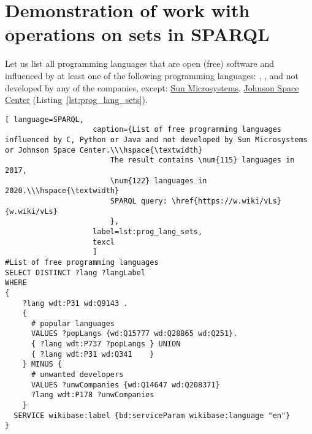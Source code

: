 \label{question:prog_lang_1}

\section{Demonstration of work with operations on sets in SPARQL}

Let us list all programming languages that are open (free) software and influenced by at least one of the following programming languages: , ,  and not developed by any of the companies, except: \href{https://en.wikipedia.org/wiki/Sun_Microsystems}{Sun Microsystems}, \href{https://en.wikipedia.org/wiki/Johnson_Space_Center}{Johnson Space Center} (Listing~\ref{lst:prog_lang_sets}).
\begin{lstlisting}[ language=SPARQL, 
                    caption={List of free programming languages influenced by C, Python or Java and not developed by Sun Microsystems or Johnson Space Center.\\\hspace{\textwidth}
                        The result contains \num{115} languages in 2017, 
                        \num{122} languages in 2020.\\\hspace{\textwidth}
                        SPARQL query: \href{https://w.wiki/vLs}{w.wiki/vLs}
                        },
                    label=lst:prog_lang_sets,
                    texcl 
                    ]
#List of free programming languages
SELECT DISTINCT ?lang ?langLabel
WHERE
{
    ?lang wdt:P31 wd:Q9143 .
    {
      # popular languages
      VALUES ?popLangs {wd:Q15777 wd:Q28865 wd:Q251}.
      { ?lang wdt:P737 ?popLangs } UNION
      { ?lang wdt:P31 wd:Q341    }
    } MINUS { 
      # unwanted developers
      VALUES ?unwCompanies {wd:Q14647 wd:Q208371}
      ?lang wdt:P178 ?unwCompanies
    }
  SERVICE wikibase:label {bd:serviceParam wikibase:language "en"}
}
\end{lstlisting}%

